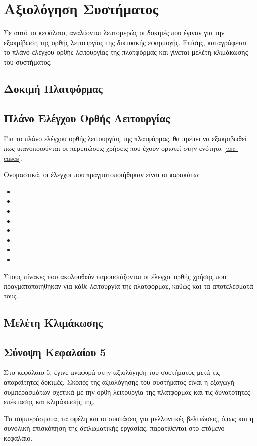 \chapter{Αξιολόγηση Συστήματος}
Σε αυτό το κεφάλαιο, αναλύονται λεπτομερώς οι δοκιμές που έγιναν για την εξακρίβωση της ορθής λειτουργίας της δικτυακής εφαρμογής. Επίσης, καταγράφεται το πλάνο ελέγχου ορθής λειτουργίας της πλατφόρμας και γίνεται μελέτη κλιμάκωσης του συστήματος.

\section{Δοκιμή Πλατφόρμας}


\section{Πλάνο Ελέγχου Ορθής Λειτουργίας}
Για το πλάνο ελέγχου ορθής λειτουργίας της πλατφόρμας, θα πρέπει να εξακριβωθεί πως ικανοποιούνται οι περιπτώσεις χρήσεις που έχουν οριστεί στην ενότητα \ref{use-cases}.

Ονομαστικά, οι έλεγχοι που πραγματοποιήθηκαν είναι οι παρακάτω:

\begin{itemize}
	\item {}
	\item {}
	\item {}
	\item {}
	\item {}
	\item {}
	\item {}
	\item {}
\end{itemize}

Στους πίνακες που ακολουθούν παρουσιάζονται οι έλεγχοι ορθής χρήσης που πραγματοποιήθηκαν για κάθε λειτουργία της πλατφόρμας, καθώς και τα αποτελέσματά τους.

\FloatBarrier

\FloatBarrier

\section{Μελέτη Κλιμάκωσης}


\section{Σύνοψη Κεφαλαίου 5}
Στο κεφάλαιο 5, έγινε αναφορά στην αξιολόγηση του συστήματος μετά τις απαραίτητες δοκιμές. Σκοπός της αξιολόγησης του συστήματος είναι η εξαγωγή συμπερασμάτων σχετικά με την ορθή λειτουργία της πλατφόρμας και τις δυνατότητες επέκτασης και κλιμάκωσής της.

Τα συμπεράσματα, τα οφέλη και οι συστάσεις για μελλοντικές βελτιώσεις, όπως και η συνολική επισκόπηση της διπλωματικής εργασίας, παρατίθενται στο επόμενο κεφάλαιο.
